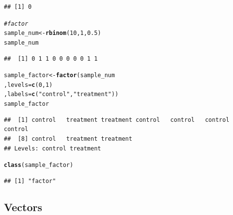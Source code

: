 \documentclass[11pt]{article}\usepackage[]{graphicx}\usepackage[]{color}
\makeatletter
\newcommand{\hlnum}[1]{\textcolor[rgb]{0.686,0.059,0.569}{#1}}%
\newcommand{\hlstr}[1]{\textcolor[rgb]{0.192,0.494,0.8}{#1}}%
\newcommand{\hlcom}[1]{\textcolor[rgb]{0.678,0.584,0.686}{\textit{#1}}}%
\newcommand{\hlstd}[1]{\textcolor[rgb]{0.345,0.345,0.345}{#1}}%
\newcommand{\hlkwb}[1]{\textcolor[rgb]{0.69,0.353,0.396}{#1}}%
\newcommand{\hlkwc}[1]{\textcolor[rgb]{0.333,0.667,0.333}{#1}}%
\newcommand{\hlkwd}[1]{\textcolor[rgb]{0.737,0.353,0.396}{\textbf{#1}}}%
\newenvironment{kframe}{%
 \def\at@end@of@kframe{}%
 \ifinner\ifhmode%
  \def\at@end@of@kframe{\end{minipage}}%
  \begin{minipage}{\columnwidth}%
 \fi\fi%
 \def\FrameCommand##1{\hskip\@totalleftmargin \hskip-\fboxsep
 \colorbox{shadecolor}{##1}\hskip-\fboxsep
     \hskip-\linewidth \hskip-\@totalleftmargin \hskip\columnwidth}%
 \MakeFramed {\advance\hsize-\width
   \@totalleftmargin\z@ \linewidth\hsize
   \@setminipage}}%
 {\par\unskip\endMakeFramed%
 \at@end@of@kframe}
\newenvironment{knitrout}{}{} %
\makeatother
\begin{document}
\begin{knitrout}
\begin{kframe}
\begin{verbatim}
## [1] 0
\end{verbatim}
\begin{alltt}
\hlcom{# factor}
\hlstd{sample_num} \hlkwb{<-} \hlkwd{rbinom}\hlstd{(}\hlnum{10}\hlstd{,}\hlnum{1}\hlstd{,}\hlnum{0.5}\hlstd{)}
\hlstd{sample_num}
\end{alltt}
\begin{verbatim}
##  [1] 0 1 1 0 0 0 0 0 1 1
\end{verbatim}
\begin{alltt}
\hlstd{sample_factor} \hlkwb{<-} \hlkwd{factor}\hlstd{(sample_num}
        \hlstd{,} \hlkwc{levels} \hlstd{=} \hlkwd{c}\hlstd{(}\hlnum{0}\hlstd{,}\hlnum{1}\hlstd{)}
        \hlstd{,} \hlkwc{labels} \hlstd{=} \hlkwd{c}\hlstd{(}\hlstr{"control"}\hlstd{,}\hlstr{"treatment"}\hlstd{))}
\hlstd{sample_factor}
\end{alltt}
\begin{verbatim}
##  [1] control   treatment treatment control   control   control   control  
##  [8] control   treatment treatment
## Levels: control treatment
\end{verbatim}
\begin{alltt}
\hlkwd{class}\hlstd{(sample_factor)}
\end{alltt}
\begin{verbatim}
## [1] "factor"
\end{verbatim}
\end{kframe}
\end{knitrout}

\subsection{Vectors}
\end{document}
